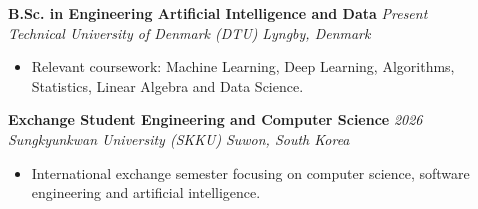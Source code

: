 \documentclass[letterpaper, 10pt]{article}
\begin{document}
\textbf{B.Sc. in Engineering Artificial Intelligence and Data}
\hfill \textit{Present} \\
\textit{Technical University of Denmark (DTU)}
\hfill \textit{Lyngby, Denmark}
\begin{itemize}
    \item Relevant coursework: Machine Learning, Deep Learning,
    Algorithms, Statistics, Linear Algebra and Data Science.
\end{itemize}

\vspace{3pt}

\textbf{Exchange Student Engineering and Computer Science}
\hfill \textit{2026} \\
\textit{Sungkyunkwan University (SKKU)}
\hfill \textit{Suwon, South Korea}
\begin{itemize}
    \item International exchange semester focusing on
    computer science, software engineering and artificial intelligence.
\end{itemize}
\end{document}
